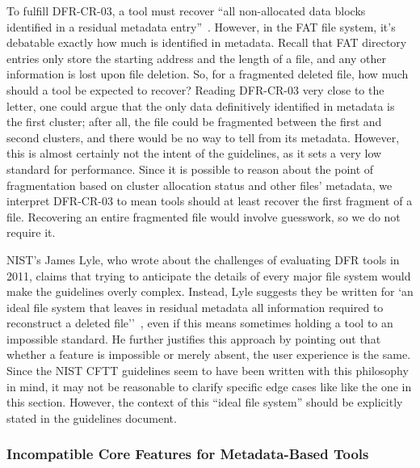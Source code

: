 To fulfill DFR-CR-03, a tool must recover ``all non-allocated data blocks identified in a residual metadata entry''~\cite{meta:dfr:standards}.
However, in the FAT file system, it's debatable exactly how much is identified in metadata.
Recall that FAT directory entries only store the starting address and the length of a file, and any other information is lost upon file deletion.
So, for a fragmented deleted file, how much should a tool be expected to recover?
Reading DFR-CR-03 very close to the letter, one could argue that the only data definitively identified in metadata is the first cluster; after all, the file could be fragmented between the first and second clusters, and there would be no way to tell from its metadata.
However, this is almost certainly not the intent of the guidelines, as it sets a very low standard for performance.
Since it is possible to reason about the point of fragmentation based on cluster allocation status and other files' metadata, we interpret DFR-CR-03 to mean tools should at least recover the first fragment of a file.
Recovering an entire fragmented file would involve guesswork, so we do not require it.

NIST's James Lyle, who wrote about the challenges of evaluating DFR tools in 2011, 
claims that trying to anticipate the details of every major file system would make the guidelines overly complex. 
Instead, Lyle suggests they be written for `an ideal file system that leaves in 
residual metadata  all  information  required  to  reconstruct  a  deleted  file''~\cite{lyle2011-ICDF2C}, even if this means sometimes holding a tool to an impossible standard.
He further justifies this approach by pointing out that whether a feature is impossible or merely absent, the user experience is the same.
Since the NIST CFTT guidelines seem to have been written with this philosophy in mind, it may not be reasonable to clarify specific edge cases like like the one in this section.
However, the context of this ``ideal file system'' should be explicitly stated in the guidelines document.

\subsubsection{Incompatible Core Features for Metadata-Based Tools}

